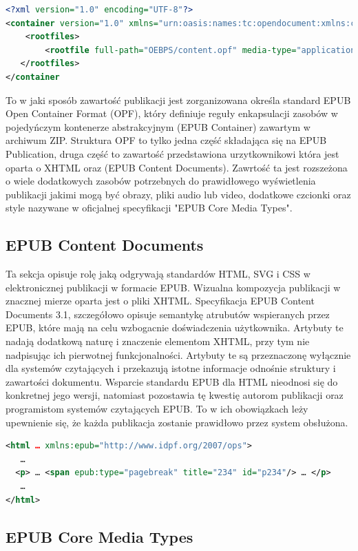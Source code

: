 \begin{lstlisting}[caption={Przykładowy plik container.xml}, language=XML]
<?xml version="1.0" encoding="UTF-8"?>
<container version="1.0" xmlns="urn:oasis:names:tc:opendocument:xmlns:container">
    <rootfiles>
        <rootfile full-path="OEBPS/content.opf" media-type="application/oebps-package+xml"/>
   </rootfiles>
</container
\end{lstlisting}

To w jaki sposób zawartość publikacji jest zorganizowana określa standard EPUB Open Container Format (OPF), który definiuje reguły
enkapsulacji zasobów w pojedyńczym kontenerze abstrakcyjnym (EPUB Container) zawartym w archiwum ZIP. Struktura OPF to tylko jedna część
składająca się na EPUB Publication, druga część to zawartość przedstawiona urzytkownikowi która jest oparta o XHTML oraz (EPUB Content
Documents). Zawrtość ta jest rozszeżona o wiele dodatkowych zasobów potrzebnych do prawidłowego wyświetlenia publikacji jakimi mogą być
obrazy, pliki audio lub video, dodatkowe czcionki oraz style nazywane w oficjalnej specyfikacji "EPUB Core Media Types".

\subsection*{EPUB Content Documents}

Ta sekcja opisuje rolę jaką odgrywają standardów HTML, SVG i CSS w elektronicznej publikacji w formacie EPUB.
Wizualna kompozycja publikacji w znacznej mierze oparta jest o pliki XHTML. Specyfikacja EPUB Content Documents 3.1, szczegółowo opisuje
semantykę atrubutów wspieranych przez EPUB, które mają na celu wzbogacnie doświadczenia użytkownika. Artybuty te nadają dodatkową naturę
i znaczenie elementom XHTML, przy tym nie nadpisując ich pierwotnej funkcjonalności. Artybuty te są przeznaczonę wyłącznie dla systemów
czytających i przekazują istotne informacje odnośnie struktury i zawartości dokumentu.
Wsparcie standardu EPUB dla HTML nieodnosi się do konkretnej jego wersji, natomiast pozostawia tę kwestię autorom publikacji oraz programistom
systemów czytających EPUB. To w ich obowiązkach leży upewnienie się, że każda publikacja zostanie prawidłowo przez system obsłużona.

\begin{lstlisting}[float=h, caption={Przykładowe wykorzystanie atrybutu epub:type aby oznaczyć zakończenie linii.\protect\footnotemark}, language=XML]
<html … xmlns:epub="http://www.idpf.org/2007/ops">
   …
  <p> … <span epub:type="pagebreak" title="234" id="p234"/> … </p>
   …
</html>
\end{lstlisting}

\subsection*{EPUB Core Media Types}
